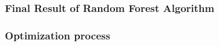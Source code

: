 \documentclass{beamer}
\begin{document}
\begin{frame}
	\frametitle{Final Result of Random Forest Algorithm}
    \begin{figure}
        
    \end{figure}
    \end{frame}

\begin{frame}
	\frametitle{Optimization process}
    \begin{figure}
        
    \end{figure}
    \end{frame}
\end{document}
